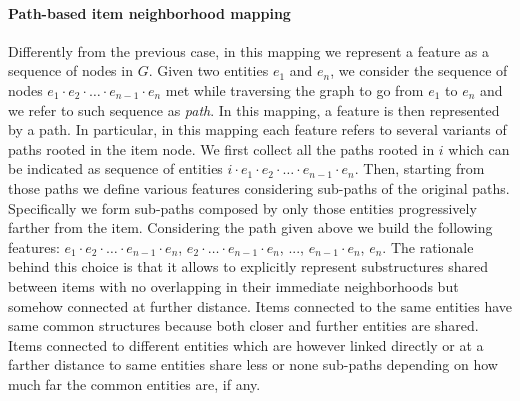 \paragraph*{\textbf{Path-based item neighborhood mapping}}
Differently from the previous case, in this mapping we represent a feature as a sequence of nodes in $G$. Given two entities $e_1$ and $e_n$, we consider the sequence of nodes $e_1 \cdot e_2 \cdot \ldots \cdot e_{n-1} \cdot e_n$ met while traversing the graph to go from $e_1$ to $e_n$ and we refer to such sequence as \textit{path}. In this  mapping, a feature is then represented by a path. In particular, in this mapping each feature refers to several variants of paths rooted in the item node. 
We first collect all the paths rooted in $i$ which can be indicated as sequence of entities $i\cdot e_1 \cdot e_2 \cdot \ldots \cdot e_{n-1} \cdot e_n$. 
Then, starting from those paths we define various features considering sub-paths of the original paths. Specifically we form sub-paths composed by only those entities progressively farther from the item.
Considering the path given above we build the following features: $e_1 \cdot e_2 \cdot  \ldots \cdot  e_{n-1} \cdot  e_n$, $e_2 \cdot  \ldots \cdot  e_{n-1} \cdot  e_n$, ..., $e_{n-1} \cdot  e_n$, $e_n$. 
The rationale behind this choice is that it allows to explicitly represent substructures shared between items with no overlapping in their immediate neighborhoods but somehow connected at further distance. Items connected to the same entities have same common structures because both closer and further entities are shared. Items connected to different entities which are however linked directly or at a farther distance to same entities  share less or none sub-paths depending on how much far the common entities are, if any.

